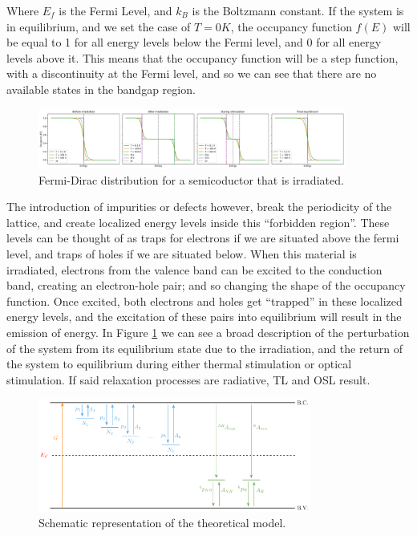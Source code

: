 \vspace{10pt}
Where $E_f$ is the Fermi Level, and $k_B$ is the Boltzmann constant. If the system is in equilibrium, and we set the case of $T=0K$, the occupancy function $f(E)$ will be equal to 1 for all energy levels below the Fermi level, and 0 for all energy levels above it. This means that the occupancy function will be a step function, with a discontinuity at the Fermi level, and so we can see that there are no available states in the bandgap region.

\begin{figure}[H]
  \centering
  \includegraphics[width=0.9\textwidth]{Images/FD_irradiation.png}
  \caption{Fermi-Dirac distribution for a semicoductor that is irradiated.}
  \label{fig:FD_irradiation}
\end{figure}


\vspace{10pt}
The introduction of impurities or defects however, break the periodicity of the lattice, and create localized energy levels inside this ``forbidden region''. These levels can be thought of as traps for electrons if we are situated above the fermi level, and traps of holes if we are situated below. When this material is irradiated, electrons from the valence band can be excited to the conduction band, creating an electron-hole pair; and so changing the shape of the occupancy function. Once excited, both electrons and holes get ``trapped'' in these localized energy levels, and the excitation of these pairs into equilibrium will result in the emission of energy. In Figure \ref{fig:FD_irradiation} we can see a broad description of the perturbation of the system from its equilibrium state due to the irradiation, and the return of the system to equilibrium during either thermal stimulation or optical stimulation. If said relaxation processes are radiative, TL and OSL result. 

\begin{figure}[H]
  \centering
  \includegraphics[width=0.8\textwidth]{Images/modeldiagram.pdf}
  \caption{Schematic representation of the theoretical model.}
  \label{fig:TheoreticalModel}
\end{figure}

